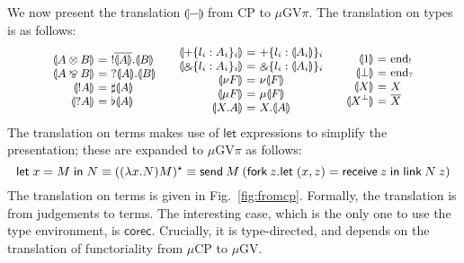 \documentclass[orivec,envcountsame]{llncs}
\makeatletter
\newcommand{\with}{\mathbin\binampersand}
\newcommand{\parr}{\mathbin\bindnasrepma}
\newcommand{\cpdual}[1]{#1^\perp}
\newcommand{\cpbang}[1]{{! #1}}
\newcommand{\cpquery}[1]{{? #1}}
\newcommand{\gvdual}[1]{\overline{#1}}
\newcommand{\gvout}[2]{{!#1.#2}}
\newcommand{\gvin}[2]{{?#1.#2}}
\newcommand{\outterm}{\mathrm{end}_!}
\newcommand{\interm}{\mathrm{end}_?}
\newcommand{\gvserver}[1]{\flat #1}
\newcommand{\gvservice}[1]{\sharp #1}
\newcommand{\mapname}{\mathsf{map}}
\newcommand{\map}[3]{\mapname^{#1}_{#2}(#3)}
\newcommand{\gvmap}[3]{\mapname^{#1}_{#2}\:#3}
\newcommand{\mkwd}[1]{\mathsf{#1}}
\newcommand{\gvsend}[2]{\mkwd{send}\:#1\:#2}
\newcommand{\gvreceive}[1]{\mkwd{receive}\:#1}
\newcommand{\gvlet}[3]{\mkwd{let}\;#1 = #2\;\mkwd{in}\;#3}
\newcommand{\gvlink}[2]{\mkwd{link}\:#1\:#2}
\newcommand{\gvfork}[2]{\mkwd{fork}\:#1.#2}
\newcommand{\gvreceivek}[4]{\gvlet{({#1}, {#2})}{\gvreceive{#3}}{#4}}
\newcommand{\key}{\mkwd}
\newcommand{\togv}[1]{\llparenthesis #1 \rrparenthesis}
\newcommand{\topi}[1]{({#1})^\star}
\newcommand{\mucp}{$\mu\mathrm{CP}$\xspace}
\newcommand{\mugv}{$\mu\mathrm{GV}$\xspace}
\newcommand{\gvpi}{$\mu\mathrm{GV}\pi$\xspace}
\newcommand{\ba}{\begin{array}}
\newcommand{\ea}{\end{array}}
\newenvironment{eqs}{\ba{@{}r@{~}c@{~}l@{}}}{\ea}
\makeatother
\begin{document}
We now present the translation $\togv{-}$ from CP to \gvpi. The translation on types is as follows:
\[\small
\ba{@{}c@{\qquad}c@{\qquad}c@{}}
\begin{eqs}
\togv{A \otimes B} &=& \gvout{\gvdual{\togv{A}}}{\togv{B}} \\
\togv{A \parr B}   &=& \gvin{\togv{A}}{\togv{B}} \\
\togv{\cpbang{A}}   &=& \gvservice{\togv{A}} \\
\togv{\cpquery{A}}  &=& \gvserver{\togv{A}} \\
\end{eqs}
&
\begin{eqs}
\togv{+\{l_i:A_i\}_i}     &=& +\{l_i:\togv{A_i}\}_i  \\
\togv{\with\{l_i:A_i\}_i} &=& \with\{l_i:\togv{A_i}\}_i \\
\togv{\nu F} &=& \nu \togv{F} \\
\togv{\mu F} &=& \mu \togv{F} \\
\togv{X.A} &=& X.\togv{A} \\
\end{eqs}
&
\begin{eqs}
\togv{1}           &=& \outterm \\
\togv{\bot}              &=& \interm \\
\togv{X}            &=& X \\
\togv{\cpdual{X}}   &=& \gvdual{X} \\
\end{eqs}
\ea
\]
The translation on terms makes use of $\key{let}$ expressions to simplify the presentation; these
are expanded to \gvpi as follows:
\[\small
\gvlet{x}{M}{N} \equiv
  \topi{(\lambda x.N) M} \equiv
  \gvsend{M}{(\gvfork{z}{\gvreceivek{x}{z}{z}{\gvlink{N}{z}}})}
\]%
The translation on terms is given in Fig.~\ref{fig:fromcp}.  Formally, the translation is from
judgements to terms. The interesting case, which is the only one to use the type environment, is
$\key{corec}$. Crucially, it is type-directed, and depends on the translation of functoriality from
\mucp to \mugv.



\end{document}
